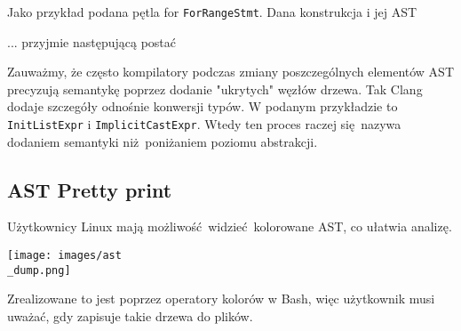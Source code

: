 			Jako przykład podana pętla for \texttt{ForRangeStmt}. Dana konstrukcja i jej AST

			
			

			... przyjmie następującą postać

			
				        
			\newpage

	        Zauważmy, że często kompilatory podczas zmiany poszczególnych elementów AST
	        precyzują semantykę poprzez dodanie "ukrytych" węzłów drzewa. Tak Clang
	        dodaje szczegóły odnośnie konwersji typów. W podanym przykładzie to
	        \texttt{InitListExpr} i \texttt{ImplicitCastExpr}. Wtedy ten proces raczej
	        się nazywa dodaniem semantyki niż poniżaniem poziomu abstrakcji.

			
			

	    \subsection{AST Pretty print}
	        Użytkownicy Linux mają możliwość widzieć kolorowane AST, co ułatwia analizę.
	        
	        \begin{center}
	        \texttt{[image: images/ast\\\_dump.png]}
	        \end{center}
	        
	        Zrealizowane to jest poprzez operatory kolorów w Bash, więc użytkownik musi uważać,
	        gdy zapisuje takie drzewa do plików.
